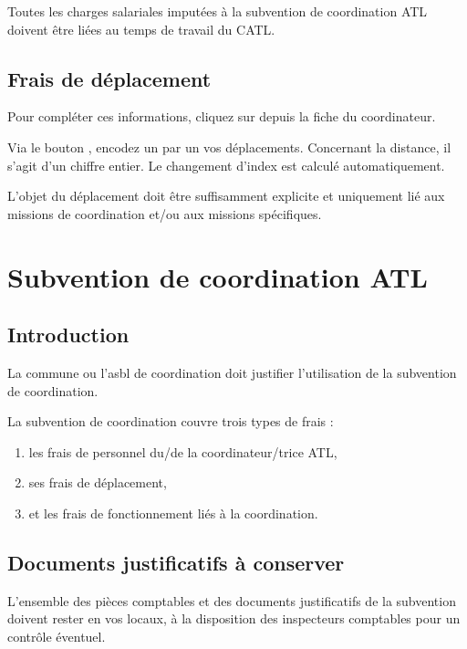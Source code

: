 \begin{remarque}
Toutes les charges salariales imputées à la subvention de coordination ATL doivent être liées au temps de travail du CATL.
\end{remarque}

\subsection{Frais de déplacement}
Pour compléter ces informations, cliquez sur  depuis la fiche du coordinateur.

Via le bouton , encodez un par un vos déplacements. Concernant la distance, il s’agit d’un chiffre entier. Le changement d’index est calculé automatiquement.

\begin{remarque}
L’objet du déplacement doit être suffisamment explicite et uniquement lié aux missions de coordination et/ou aux missions spécifiques.
\end{remarque}


\section{Subvention de coordination ATL}
\subsection{Introduction}
La commune ou l’asbl de coordination doit justifier l’utilisation de la subvention de coordination. 

La subvention de coordination couvre trois types de frais : 
\begin{enumerate}
    \item les frais de personnel du/de la coordinateur/trice ATL, 
    \item ses frais de déplacement,
    \item et les frais de fonctionnement liés à la coordination. 
\end{enumerate}

\subsection{Documents justificatifs à conserver}

L'ensemble des pièces comptables et des documents justificatifs de la subvention doivent rester en vos locaux, à la disposition des inspecteurs comptables pour un contrôle éventuel.


